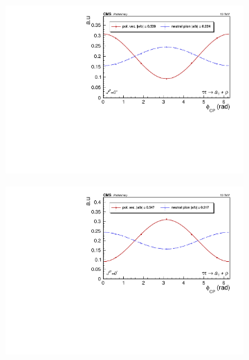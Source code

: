 \begin{figure}[]
  \begin{subfigure}[b]{0.5\linewidth}
    \centering
    \includegraphics[width=\linewidth]{Chapitre6/Images/A1RHO/A1RHO_even_gen.pdf} 
    \caption*{} 
    \vspace{10mm}
  \end{subfigure}%
  \begin{subfigure}[b]{0.5\linewidth}
    \centering
    \includegraphics[width=\linewidth]{Chapitre6/Images/A1RHO/A1RHO_odd_gen.pdf} 
    \caption*{} 
    \vspace{10mm}
  \end{subfigure} 


\end{figure}
